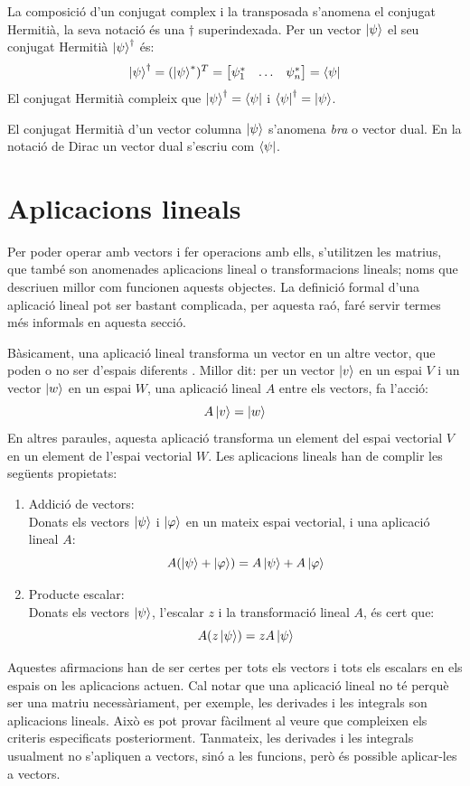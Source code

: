 La composició d'un conjugat complex i la transposada s'anomena el conjugat Hermitià, la seva notació és una $\dagger$ superindexada. Per un vector $\ket{\psi}$ el seu conjugat Hermitià $\ket{\psi}^\dagger$ és:
$$
\ket{\psi}^\dagger = (\ket{\psi}^*)^T =  \begin{bmatrix} \psi_{1}^* & \dots & \psi_{n}^* \end{bmatrix} = \bra{\psi}
$$
El conjugat Hermitià compleix que $\ket{\psi}^\dagger = \bra{\psi}$ i $\bra{\psi}^\dagger = \ket{\psi}$.

El conjugat Hermitià d'un vector columna $\ket{\psi}$ s'anomena \textit{bra} o vector dual. En la notació de Dirac un vector dual s'escriu com $\bra{\psi}$.

\section{Aplicacions lineals}
Per poder operar amb vectors i fer operacions amb ells, s'utilitzen les matrius, que també son anomenades aplicacions lineal o transformacions lineals; noms que descriuen millor com funcionen aquests objectes. La definició formal d'una aplicació lineal pot ser bastant complicada, per aquesta raó, faré servir termes més informals en aquesta secció. 

Bàsicament, una aplicació lineal transforma un vector en un altre vector, que poden o no ser d'espais diferents \cite{LR_done_right:linear_map}. Millor dit: per un vector $\ket{v}$ en un espai $V$ i un vector $\ket{w}$ en un espai $W$, una aplicació lineal $A$ entre els vectors, fa l'acció:
$$
A \ket{v} = \ket{w}
$$
En altres paraules, aquesta aplicació transforma un element del espai vectorial $V$ en un element de l'espai vectorial $W$.
Les aplicacions lineals han de complir les següents propietats:
\begin{enumerate}
	\item Addició de vectors: \\
	Donats els vectors $\ket{\psi}$ i $\ket{\varphi}$ en un mateix espai vectorial, i una aplicació lineal $A$:
	$$ A(\ket{\psi} + \ket{\varphi}) = A\ket{\psi} + A\ket{\varphi}$$ 
	\item Producte escalar:\\
	Donats els vectors $\ket{\psi}$, l'escalar $z$ i la transformació lineal $A$, és cert que:
	$$ A(z\ket{\psi}) = z A \ket{\psi}$$
\end{enumerate}

Aquestes afirmacions han de ser certes per tots els vectors i tots els escalars en els espais on les aplicacions actuen. Cal notar que una aplicació lineal no té perquè ser una matriu necessàriament, per exemple, les derivades i les integrals son aplicacions lineals. Això es pot provar fàcilment al veure que compleixen els criteris especificats posteriorment. Tanmateix, les derivades i les integrals usualment no s'apliquen a vectors, sinó a les funcions, però és possible aplicar-les a vectors.

